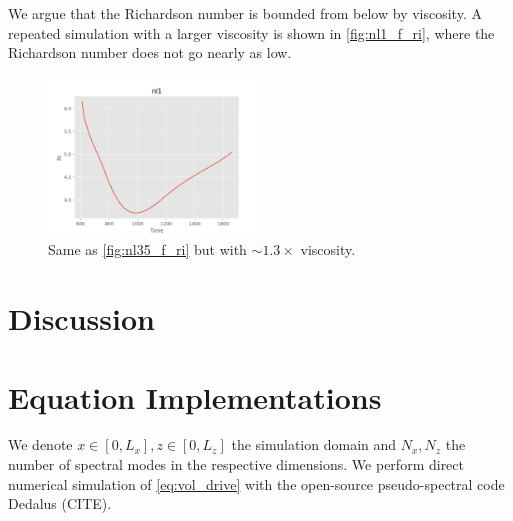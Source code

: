 \documentclass[twocolumn,
        nofootinbib, %
        usenames, %
        aps,
        prd,
        dvipsnames %
    ]{revtex4-1}%
\begin{document}
We argue that the Richardson number is bounded from below by viscosity. A
repeated simulation with a larger viscosity is shown in \autoref{fig:nl1_f_ri},
where the Richardson number does not go nearly as low.
\begin{figure}[t]
    \centering
    \includegraphics[width=0.5\textwidth]{plots/nl1_f_ri.png}
    \caption{Same as \autoref{fig:nl35_f_ri} but with $\sim 1.3\times$
    viscosity.}\label{fig:nl1_f_ri}
\end{figure}

\section{Discussion}\label{s:discussion}

\clearpage
\onecolumngrid
\appendix

\section{Equation Implementations}\label{ss:strat_impl}

We denote $x \in [0, L_x], z \in [0, L_z]$ the simulation domain and $N_x, N_z$
the number of spectral modes in the respective dimensions. We perform direct
numerical simulation of \autoref{eq:vol_drive} with the open-source
pseudo-spectral code Dedalus (CITE).
\end{document}
